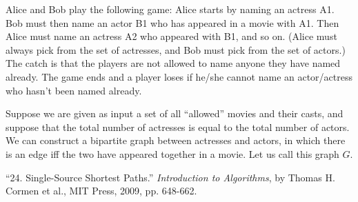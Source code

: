 \documentclass[addpoints]{exam}
\begin{document}
\begin{questions}
Alice and Bob play the following game: Alice starts by naming an actress A1. Bob must then name an actor B1 who has appeared in a movie with A1. Then Alice must name an actress A2 who appeared with B1, and so on. (Alice must always pick from the set of actresses, and Bob must pick from the set of actors.) The catch is that the players are not allowed to name anyone they have named already. The game ends and a player loses if he/she cannot name an actor/actress who hasn't been named already.

Suppose we are given as input a set of all ``allowed'' movies and their casts, and suppose that the total number of actresses is equal to the total number of actors. We can construct a bipartite graph between actresses and actors, in which there is an edge iff the two have appeared together in a movie. Let us call this graph $G$.  


\end{questions}

\begin{thebibliography}{9}

 \enquote{24. Single-Source Shortest Paths.} \textit{Introduction to Algorithms}, by Thomas H. Cormen et al., MIT Press, 2009, pp. 648-662.

\end{thebibliography}
\end{document}
